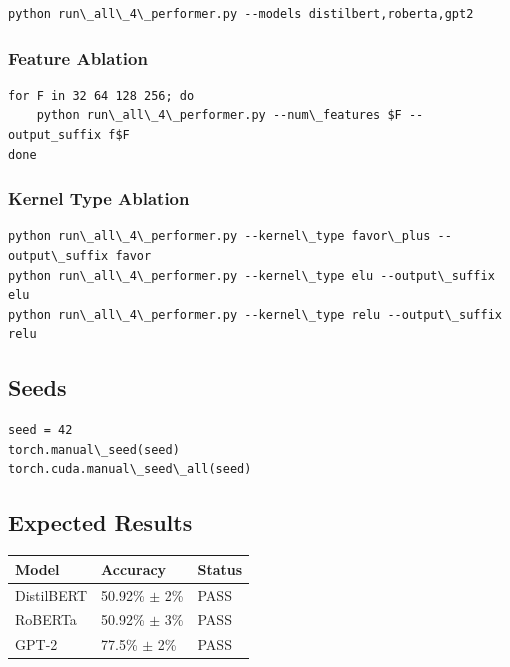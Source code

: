 \begin{lstlisting}
python run\_all\_4\_performer.py --models distilbert,roberta,gpt2
\end{lstlisting}

\subsubsection{Feature Ablation}

\begin{lstlisting}
for F in 32 64 128 256; do
    python run\_all\_4\_performer.py --num\_features $F --output_suffix f$F
done
\end{lstlisting}

\subsubsection{Kernel Type Ablation}

\begin{lstlisting}
python run\_all\_4\_performer.py --kernel\_type favor\_plus --output\_suffix favor
python run\_all\_4\_performer.py --kernel\_type elu --output\_suffix elu
python run\_all\_4\_performer.py --kernel\_type relu --output\_suffix relu
\end{lstlisting}

\subsection{Seeds}

\begin{lstlisting}
seed = 42
torch.manual\_seed(seed)
torch.cuda.manual\_seed\_all(seed)
\end{lstlisting}

\subsection{Expected Results}

\begin{table}[H]
\centering
\small
\begin{tabular}{lll}
\toprule
\textbf{Model} & \textbf{Accuracy} & \textbf{Status} \\
\midrule
DistilBERT & 50.92\% $\pm$ 2\% & PASS \\
RoBERTa & 50.92\% $\pm$ 3\% & PASS \\
GPT-2 & 77.5\% $\pm$ 2\% & PASS \\
\bottomrule
\end{tabular}
\end{table}


